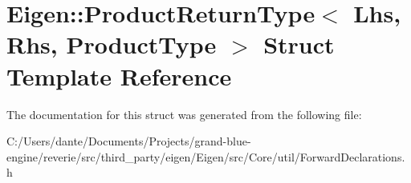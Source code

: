 \hypertarget{struct_eigen_1_1_product_return_type}{}\section{Eigen\+::Product\+Return\+Type$<$ Lhs, Rhs, Product\+Type $>$ Struct Template Reference}
\label{struct_eigen_1_1_product_return_type}


The documentation for this struct was generated from the following file\+:\begin{DoxyCompactItemize}
\item 
C\+:/\+Users/dante/\+Documents/\+Projects/grand-\/blue-\/engine/reverie/src/third\+\_\+party/eigen/\+Eigen/src/\+Core/util/Forward\+Declarations.\+h\end{DoxyCompactItemize}
